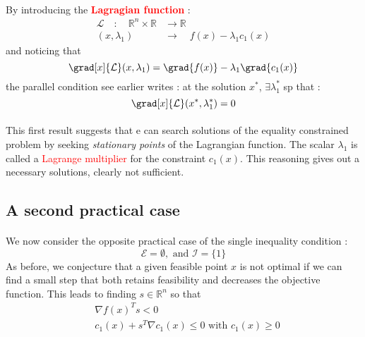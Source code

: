 \documentclass[a4paper]{article}
\begin{document}
{{			\paragraph{} By introducing the \textbf{\textcolor{red}{Lagragian function}} : 
			\begin{equation}
				\begin{aligned}
					\mathcal{L} \quad : \quad \mathbb{R}^n\times \mathbb{R} &\to \mathbb{R} \\
					(x,\lambda_1) \quad &\to \quad f(x) - \lambda_1c_1(x) 
				\end{aligned}
			\end{equation}
			and noticing that 
			\begin{equation}
				\grad[x]{\mathcal{L}}(x,\lambda_1) = \grad{f(x)} - \lambda_1\grad{c_1(x)}
			\end{equation}
			the parallel condition see earlier writes : at the solution $x^*$, $\exists \lambda_1^*$ sp that : 
			\begin{equation}
				\grad[x]{\mathcal{L}}(x^*, \lambda_1^*) = 0
			\end{equation}
			
			\paragraph{} This first result suggests that e can search solutions of the equality constrained problem by seeking \emph{stationary points} of the Lagrangian function. The scalar $\lambda_1$ is called a \textcolor{red}{Lagrange multiplier} for the constraint $c_1(x)$. This reasoning gives out a necessary solutions, clearly not sufficient. 
		}
		\subsection{A second practical case}
		{
			\paragraph{} We now consider the opposite practical case of the single inequality condition :
			\begin{equation}
				\mathcal{E} = \emptyset, \text{ and } \mathcal{I} = \{1\}
			\end{equation}
			As before, we conjecture that a given feasible point $x$ is not optimal if we can find a small step that both retains feasibility and decreases the objective function. This leads to finding $s\in\mathbb{R}^n$ so that 
			\begin{equation}
				\begin{aligned}
					&\nabla f(x) ^T s < 0 \\
					&c_1(x) + s^T\nabla c_1(x) \leq 0 \text{ with } c_1(x) \geq 0
				\end{aligned}
			\end{equation} 
			
}}
\end{document}
